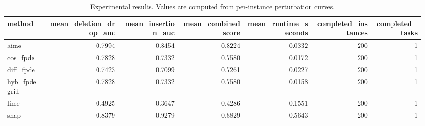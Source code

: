 \begin{table}[t]
\caption{Experimental results. Values are computed from per-instance perturbation curves.}
\label{tab:main_results_computed}
\centering
\begin{tabular}{lrrrrrr}
\toprule
method & mean\_deletion\_drop\_auc & mean\_insertion\_auc & mean\_combined\_score & mean\_runtime\_seconds & completed\_instances & completed\_tasks \\
\midrule
aime & 0.7994 & 0.8454 & 0.8224 & 0.0332 & 200 & 1 \\
cos\_fpde & 0.7828 & 0.7332 & 0.7580 & 0.0172 & 200 & 1 \\
diff\_fpde & 0.7423 & 0.7099 & 0.7261 & 0.0227 & 200 & 1 \\
hyb\_fpde\_grid & 0.7828 & 0.7332 & 0.7580 & 0.0158 & 200 & 1 \\
lime & 0.4925 & 0.3647 & 0.4286 & 0.1551 & 200 & 1 \\
shap & 0.8379 & 0.9279 & 0.8829 & 0.5643 & 200 & 1 \\
\bottomrule
\end{tabular}

\end{table}
